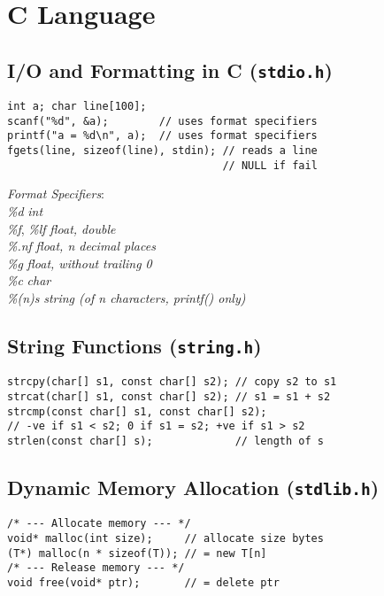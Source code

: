 \section{C Language}

\subsection*{I/O and Formatting in C (\texttt{stdio.h})}

\begin{verbatim}
int a; char line[100];
scanf("%d", &a);        // uses format specifiers
printf("a = %d\n", a);  // uses format specifiers
fgets(line, sizeof(line), stdin); // reads a line
                                  // NULL if fail
\end{verbatim}
\vspace*{-1.25\baselineskip}

\emph{Format Specifiers}:\\
\qquad \emph{\%d} \hfill \textit{int}\\
\qquad \emph{\%f}, \emph{\%lf} \hfill \textit{float, double}\\
\qquad \emph{\%.nf} \hfill \textit{float, n decimal places}\\
\qquad \emph{\%g} \hfill \textit{float, without trailing 0}\\
\qquad \emph{\%c} \hfill \textit{char}\\
\qquad \emph{\%(n)s} \hfill \textit{string (of n characters, printf() only)}\\

\subsection*{String Functions (\texttt{string.h})}

\begin{verbatim}
strcpy(char[] s1, const char[] s2); // copy s2 to s1
strcat(char[] s1, const char[] s2); // s1 = s1 + s2
strcmp(const char[] s1, const char[] s2);
// -ve if s1 < s2; 0 if s1 = s2; +ve if s1 > s2
strlen(const char[] s);             // length of s
\end{verbatim}
\vspace*{-1.25\baselineskip}

\subsection*{Dynamic Memory Allocation (\texttt{stdlib.h})}
\begin{verbatim}
/* --- Allocate memory --- */
void* malloc(int size);     // allocate size bytes
(T*) malloc(n * sizeof(T)); // = new T[n]
/* --- Release memory --- */
void free(void* ptr);       // = delete ptr
\end{verbatim}
\vspace*{-1.25\baselineskip}

